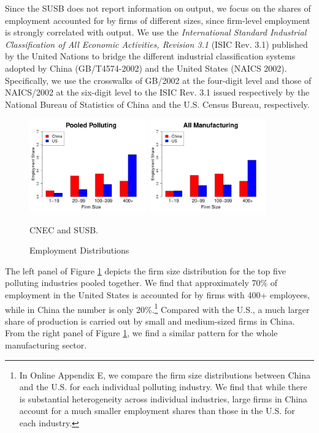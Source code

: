 \documentclass[AEJ]{AEA}
\begin{document}
Since the SUSB does not report information on output, we focus on the shares of employment accounted for by firms of different sizes, since firm-level employment is strongly correlated with output. We use the \textit{International Standard Industrial Classification of All Economic Activities, Revision 3.1} (ISIC Rev. 3.1) published by the United Nations to bridge the different industrial classification systems adopted by China (GB/T4574-2002) and the United States (NAICS 2002). Specifically, we use the crosswalks of GB/2002 at the four-digit level and those of NAICS/2002 at the six-digit level to the ISIC Rev. 3.1 issued respectively by the National Bureau of Statistics of China and the U.S. Census Bureau, respectively.
\begin{figure}[t]
    \begin{center}
    \includegraphics[width=0.45\textwidth]{./Figures/poolES_R_1.pdf}
    \includegraphics[width=0.45\textwidth]{./Figures/allES_R_1.pdf}
    \caption{Employment Distributions}
    \begin{figurenotes}[Sources]
        CNEC and SUSB.
    \end{figurenotes}
    \label{fig:es}
    \end{center}
\end{figure}

The left panel of Figure \ref{fig:es} depicts the firm size distribution for the top five polluting industries pooled together. We find that approximately 70\% of employment in the United States is accounted for by firms with 400+ employees, while in China the number is only 20\%.\footnote{In Online Appendix E, we compare the firm size distributions between China and the U.S. for each individual polluting industry. We find that while there is substantial heterogeneity across individual industries, large firms in China account for a much smaller employment shares than those in the U.S. for each industry.} 
Compared with the U.S., a much larger share of production is carried out by small and medium-sized firms in China. From the right panel of Figure \ref{fig:es}, we find a similar pattern for the whole manufacturing sector.
\end{document}
